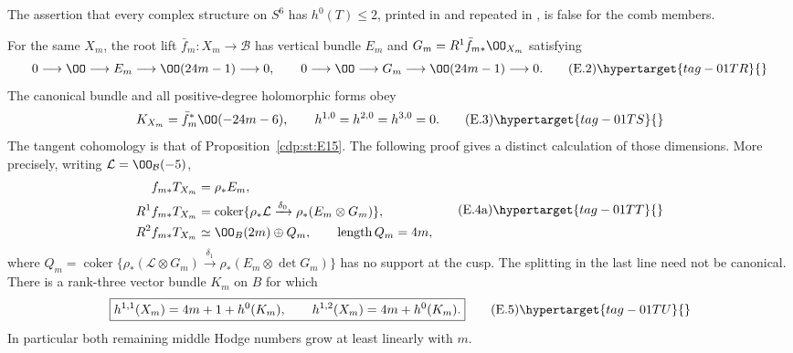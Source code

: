
\begin{proposition}\hypertarget{tag-01SX}{}\label{inv:E2.4}


The assertion that every complex structure on $S^6$ has
$h^0(T)\le2$, printed in
\citet[Corollary 1.3; verified preprint p.~2]{HKP2000}
and repeated in \citet[Remarks 1.2 and 9.26]{AC2026}, is false
for the comb members.
\end{proposition}

\begin{proposition}\hypertarget{tag-01SV}{}\label{inv:E2.2}


For the same $X_m$, the root lift $\bar f_m:X_m\to\mathcal B$ has
vertical bundle $E_m$ and $G_m=R^1\bar f_{m*}\OO_{X_m}$ satisfying
\[
 0\longrightarrow\OO\longrightarrow E_m
       \longrightarrow\OO(24m-1)\longrightarrow0,
 \qquad
 0\longrightarrow\OO\longrightarrow G_m
       \longrightarrow\OO(24m-1)\longrightarrow0.      \tag{E.2}\hypertarget{tag-01TR}{}\label{invII:eq:E.2}
\]
The canonical bundle and all positive-degree holomorphic forms obey
\[
 K_{X_m}=\bar f_m^*\OO(-24m-6),\qquad
 h^{1,0}=h^{2,0}=h^{3,0}=0.                            \tag{E.3}\hypertarget{tag-01TS}{}\label{invII:eq:E.3}
\]
The tangent cohomology is that of Proposition~\ref{cdp:st:E15}.
The following proof gives a distinct calculation of those dimensions.
More precisely, writing $\mathcal L=\OO_{\mathcal B}(-5)$,
\[
 \begin{split}
 f_{m*}T_{X_m}&=\rho_*E_m,\\
 R^1f_{m*}T_{X_m}&=
  \operatorname{coker}\{\rho_*\mathcal L\xrightarrow{\delta_0}
                                      \rho_*(E_m\otimes G_m)\},\\
 R^2f_{m*}T_{X_m}&\simeq\OO_B(2m)\oplus Q_m,
 \qquad\operatorname{length}Q_m=4m,
 \end{split}                                        \tag{E.4a}\hypertarget{tag-01TT}{}\label{invII:eq:E.4a}
\]
where $Q_m=\operatorname{coker}\{\rho_*(\mathcal L\otimes G_m)
\xrightarrow{\delta_1}\rho_*(E_m\otimes\det G_m)\}$ has no support
at the cusp. The splitting in the last line need not be canonical.
There is a rank-three vector bundle $K_m$ on $B$ for which
\[
 \boxed{h^{1,1}(X_m)=4m+1+h^0(K_m),\qquad
 h^{1,2}(X_m)=4m+h^0(K_m).}                            \tag{E.5}\hypertarget{tag-01TU}{}\label{invII:eq:E.5}
\]
In particular both remaining middle Hodge numbers grow at least
linearly with $m$.
\end{proposition}

